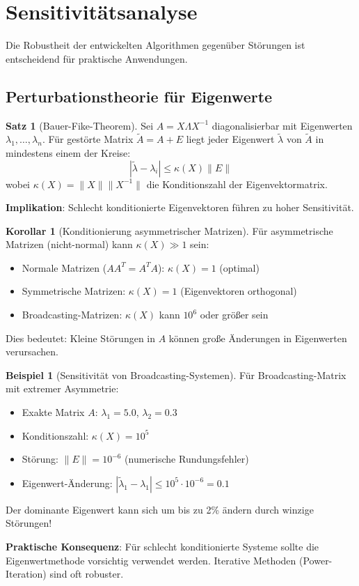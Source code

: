 \documentclass[a4paper,12pt]{report}
\theoremstyle{definition}
\newtheorem{beispiel}{Beispiel}
\newtheorem{satz}{Satz}
\newtheorem{korollar}{Korollar}
\begin{document}
	\section{Sensitivitätsanalyse}
	
	Die Robustheit der entwickelten Algorithmen gegenüber Störungen ist entscheidend für praktische Anwendungen.
	
	\subsection{Perturbationstheorie für Eigenwerte}
	
	\begin{satz}[Bauer-Fike-Theorem]
		Sei $A = X \Lambda X^{-1}$ diagonalisierbar mit Eigenwerten $\lambda_1, \ldots, \lambda_n$. Für gestörte Matrix $\tilde{A} = A + E$ liegt jeder Eigenwert $\tilde{\lambda}$ von $\tilde{A}$ in mindestens einem der Kreise:
		\[
		|\tilde{\lambda} - \lambda_i| \leq \kappa(X) \|E\|
		\]
		wobei $\kappa(X) = \|X\| \|X^{-1}\|$ die Konditionszahl der Eigenvektormatrix.
		
		\textbf{Implikation}: Schlecht konditionierte Eigenvektoren führen zu hoher Sensitivität.
	\end{satz}
	
	\begin{korollar}[Konditionierung asymmetrischer Matrizen]
		Für asymmetrische Matrizen (nicht-normal) kann $\kappa(X) \gg 1$ sein:
		\begin{itemize}
			\item Normale Matrizen ($AA^T = A^T A$): $\kappa(X) = 1$ (optimal)
			\item Symmetrische Matrizen: $\kappa(X) = 1$ (Eigenvektoren orthogonal)
			\item Broadcasting-Matrizen: $\kappa(X)$ kann $10^6$ oder größer sein
		\end{itemize}
		
		Dies bedeutet: Kleine Störungen in $A$ können große Änderungen in Eigenwerten verursachen.
	\end{korollar}
	
	\begin{beispiel}[Sensitivität von Broadcasting-Systemen]
		Für Broadcasting-Matrix mit extremer Asymmetrie:
		\begin{itemize}
			\item Exakte Matrix $A$: $\lambda_1 = 5.0$, $\lambda_2 = 0.3$
			\item Konditionszahl: $\kappa(X) = 10^5$
			\item Störung: $\|E\| = 10^{-6}$ (numerische Rundungsfehler)
			\item Eigenwert-Änderung: $|\tilde{\lambda}_1 - \lambda_1| \leq 10^5 \cdot 10^{-6} = 0.1$
		\end{itemize}
		
		Der dominante Eigenwert kann sich um bis zu 2\% ändern durch winzige Störungen!
		
		\textbf{Praktische Konsequenz}: Für schlecht konditionierte Systeme sollte die Eigenwertmethode vorsichtig verwendet werden. Iterative Methoden (Power-Iteration) sind oft robuster.
	\end{beispiel}
	
\end{document}
